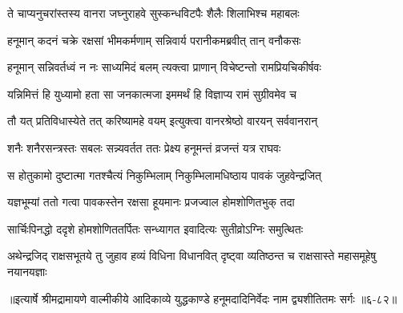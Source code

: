 \twolineshloka
{ते चाप्यनुचरांस्तस्य वानरा जघ्नुराहवे}
{सुस्कन्धविटपैः शैलैः शिलाभिश्च महाबलः} %

\twolineshloka
{हनूमान् कदनं चक्रे रक्षसां भीमकर्मणाम्}
{सन्निवार्य परानीकमब्रवीत् तान् वनौकसः} %

\twolineshloka
{हनूमान् सन्निवर्तध्वं न नः साध्यमिदं बलम्}
{त्यक्त्वा प्राणान् विचेष्टन्तो रामप्रियचिकीर्षवः} %

\twolineshloka
{यन्निमित्तं हि युध्यामो हता सा जनकात्मजा}
{इममर्थं हि विज्ञाप्य रामं सुग्रीवमेव च} %

\twolineshloka
{तौ यत् प्रतिविधास्येते तत् करिष्यामहे वयम्}
{इत्युक्त्वा वानरश्रेष्ठो वारयन् सर्ववानरान्} %

\twolineshloka
{शनैः शनैरसन्त्रस्तः सबलः सन्न्यवर्तत}
{ततः प्रेक्ष्य हनूमन्तं व्रजन्तं यत्र राघवः} %

\twolineshloka
{स होतुकामो दुष्टात्मा गतश्चैत्यं निकुम्भिलाम्}
{निकुम्भिलामधिष्ठाय पावकं जुहवेन्द्रजित्} %

\twolineshloka
{यज्ञभूम्यां ततो गत्वा पावकस्तेन रक्षसा}
{हूयमानः प्रजज्वाल होमशोणितभुक् तदा} %

\twolineshloka
{सार्चिःपिनद्धो ददृशे होमशोणिततर्पितः}
{सन्ध्यागत इवादित्यः सुतीव्रोऽग्निः समुत्थितः} %

\twolineshloka
{अथेन्द्रजिद् राक्षसभूतये तु जुहाव हव्यं विधिना विधानवित्}
{दृष्ट्वा व्यतिष्ठन्त च राक्षसास्ते महासमूहेषु नयानयज्ञाः} %


॥इत्यार्षे श्रीमद्रामायणे वाल्मीकीये आदिकाव्ये युद्धकाण्डे हनूमदादिनिर्वेदः नाम द्व्यशीतितमः सर्गः ॥६-८२॥
